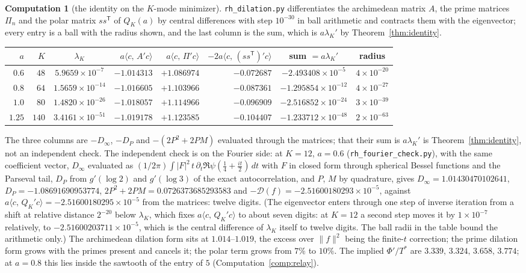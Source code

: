 \documentclass[11pt]{article}
\theoremstyle{definition}
\newtheorem{computation}[theorem]{Computation}
\theoremstyle{remark}
\newcommand{\ip}[2]{\langle #1,\, #2\rangle}
\newcommand{\Tst}{T^{*}}
\begin{document}
\begin{computation}[the identity on the $K$-mode minimizer]\label{comp:identity}
\texttt{rh\_dilation.py} differentiates the archimedean matrix $A$, the prime matrices $\Pi_n$ and the polar matrix $ss^{\mathsf T}$ of $Q_K(a)$ by central differences with step $10^{-30}$ in ball arithmetic and contracts them with the eigenvector; every entry is a ball with the radius shown, and the last column is the sum, which is $a\lambda_K'$ by Theorem~\ref{thm:identity}.
\begin{center}
\begin{tabular}{@{}rrcrrrcc@{}}
\toprule
$a$ & $K$ & $\lambda_K$ & $a\ip{c}{A'c}$ & $a\ip{c}{\Pi'c}$ & $-2a\ip{c}{(ss^{\mathsf T})'c}$ & sum $=a\lambda_K'$ & radius\\
\midrule
$0.6$ & $48$ & $5.9659\times10^{-7}$ & $-1.014313$ & $+1.086974$ & $-0.072687$ & $-2.493408\times10^{-5}$ & $4\times10^{-20}$\\
$0.8$ & $64$ & $1.5659\times10^{-14}$ & $-1.016605$ & $+1.103966$ & $-0.087361$ & $-1.295854\times10^{-12}$ & $4\times10^{-27}$\\
$1.0$ & $80$ & $1.4820\times10^{-26}$ & $-1.018057$ & $+1.114966$ & $-0.096909$ & $-2.516852\times10^{-24}$ & $3\times10^{-39}$\\
$1.25$ & $140$ & $3.4161\times10^{-51}$ & $-1.019178$ & $+1.123585$ & $-0.104407$ & $-1.233712\times10^{-48}$ & $2\times10^{-63}$\\
\bottomrule
\end{tabular}
\end{center}
The three columns are $-D_\infty$, $-D_P$ and $-(2P^2+2PM)$ evaluated through the matrices; that their sum is $a\lambda_K'$ is Theorem~\ref{thm:identity}, not an independent check. The independent check is on the Fourier side: at $K=12$, $a=0.6$ (\texttt{rh\_fourier\_check.py}), with the same coefficient vector, $D_\infty$ evaluated as $(1/2\pi)\int|F|^2\,t\,\partial_t\Re\psi(\tfrac14+\tfrac{it}2)\,dt$ with $F$ in closed form through spherical Bessel functions and the Parseval tail, $D_P$ from $g'(\log2)$ and $g'(\log3)$ of the exact autocorrelation, and $P$, $M$ by quadrature, gives $D_\infty=1.01430470102641$, $D_P=-1.08691690953774$, $2P^2+2PM=0.0726373685293583$ and $-\mathcal D(f)=-2.51600180293\times10^{-5}$, against $a\ip{c}{Q_K'c}=-2.51600180295\times10^{-5}$ from the matrices: twelve digits. (The eigenvector enters through one step of inverse iteration from a shift at relative distance $2^{-20}$ below $\lambda_K$, which fixes $a\ip{c}{Q_K'c}$ to about seven digits: at $K=12$ a second step moves it by $1\times10^{-7}$ relatively, to $-2.51600203711\times10^{-5}$, which is the central difference of $\lambda_K$ itself to twelve digits. The ball radii in the table bound the arithmetic only.) The archimedean dilation form sits at $1.014$--$1.019$, the excess over $\|f\|^2$ being the finite-$t$ correction; the prime dilation form grows with the primes present and cancels it; the polar term grows from $7\%$ to $10\%$. The implied $\Phi'/\Tst$ are $3.339,\,3.324,\,3.658,\,3.774$; at $a=0.8$ this lies inside the sawtooth of the entry of $5$ (Computation~\ref{comp:relay}).
\end{computation}
\end{document}
